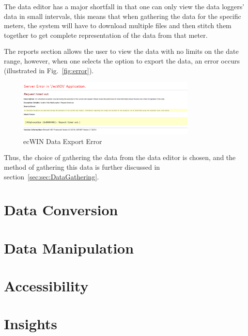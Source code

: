 \documentclass[12pt,onecolumn]{IEEEtran}
\begin{document}
The data editor has a major shortfall in that one can only view the data loggers' data in small intervals, this means that when gathering the data for the specific meters, the system will have to download multiple files and then stitch them together to get complete representation of the data from that meter.

The reports section allows the user to view the data with no limits on the date range, however, when one selects the option to export the data, an error occurs (illustrated in Fig.~\ref{fig:error}). 

\begin{center}
    \begin{figure}[htb]
        \centering
        \includegraphics[width=0.8\textwidth]{ecwinerror.png}
        \caption{ecWIN Data Export Error}
        \label{fig:ecwinerror}
    \end{figure}
\end{center}

Thus, the choice of gathering the data from the data editor is chosen, and the method of gathering this data is further discussed in section~\ref{sec:sec:DataGathering}.


\section{Data Conversion} \label{sec:DataConversion}

\section{Data Manipulation} \label{sec:DataManipulation}

\section{Accessibility} \label{sec:Accessibility}

\section{Insights} \label{sec:Insights}


\cite{datasite}



\end{document}
